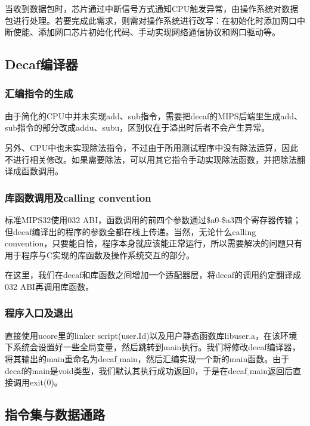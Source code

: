 当收到数据包时，芯片通过中断信号方式通知CPU触发异常，由操作系统对数据包进行处理。若要完成此需求，则需对操作系统进行改写：在初始化时添加网口中断使能、添加网口芯片初始化代码、手动实现网络通信协议和网口驱动等。
\subsection{Decaf编译器}
\subsubsection{汇编指令的生成}
由于简化的CPU中并未实现add、sub指令，需要把decaf的MIPS后端里生成add、sub指令的部分改成addu、subu，区别仅在于溢出时后者不会产生异常。

另外、CPU中也未实现除法指令，不过由于所用测试程序中没有除法运算，因此不进行相关修改。如果需要除法，可以用其它指令手动实现除法函数，并把除法翻译成函数调用。
\subsubsection{库函数调用及calling convention}
标准MIPS32使用032 ABI，函数调用的前四个参数通过\$a0-\$a3四个寄存器传输；但decaf编译出的程序的参数全都在栈上传递。当然，无论什么calling convention，只要能自恰，程序本身就应该能正常运行，所以需要解决的问题只有用于程序与C实现的库函数及操作系统交互的部分。

在这里，我们在decaf和库函数之间增加一个适配器层，将decaf的调用约定翻译成032 ABI再调用库函数。
\subsubsection{程序入口及退出}
直接使用ucore里的linker script(user.Id)以及用户静态函数库libuser.a，在该环境下系统会设置好一些全局变量，然后跳转到main执行。我们将修改decaf编译器，将其输出的main重命名为decaf$\_$main，然后汇编实现一个新的main函数。由于decaf的main是void类型，我们默认其执行成功返回0，于是在decaf$\_$main返回后直接调用exit(0)。
\subsection{指令集与数据通路}
